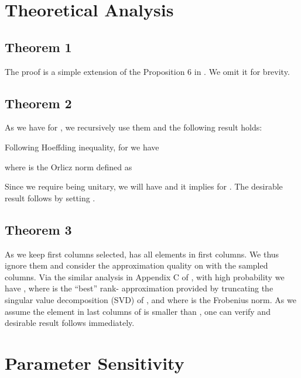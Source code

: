 \documentclass{article}
\begin{document}
\section{Theoretical Analysis}

\subsection{Theorem 1}
The proof is a simple extension of the Proposition 6 in \cite{Hippo}. We omit it for brevity.


\subsection{Theorem 2}
As we have  for , we recursively use them and the following result holds:

Following Hoeffding inequality, for  we have

where  is the Orlicz norm defined as

Since we require  being unitary, we will have  and it implies  for . The desirable result follows by setting .

\subsection{Theorem 3}




As we keep first  columns selected,  has all  elements in first  columns. We thus ignore them and consider the approximation quality on  with the sampled columns.  Via the similar analysis in Appendix C of \cite{FedFormer}, with high probability we have , where  is the ``best” rank- approximation provided by truncating the singular value decomposition (SVD) of , and where 
is the Frobenius norm. As we assume the element in last  columns of  is smaller than , one can verify   and desirable result follows immediately.  



 \section{Parameter Sensitivity}
\label{app:parameter}
\end{document}
